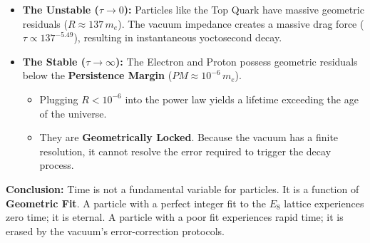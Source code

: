 \begin{itemize}
    \item \textbf{The Unstable ($\tau \to 0$):} Particles like the Top Quark have massive geometric residuals ($R \approx 137 \, m_e$). The vacuum impedance creates a massive drag force ($\tau \propto 137^{-5.49}$), resulting in instantaneous yoctosecond decay.
    \item \textbf{The Stable ($\tau \to \infty$):} The Electron and Proton possess geometric residuals below the \textbf{Persistence Margin} ($PM \approx 10^{-6} \, m_e$).
    \begin{itemize}
        \item Plugging $R < 10^{-6}$ into the power law yields a lifetime exceeding the age of the universe.
        \item They are \textbf{Geometrically Locked}. Because the vacuum has a finite resolution, it cannot resolve the error required to trigger the decay process.
    \end{itemize}
\end{itemize}

\textbf{Conclusion:} Time is not a fundamental variable for particles. It is a function of \textbf{Geometric Fit}. A particle with a perfect integer fit to the $E_8$ lattice experiences zero time; it is eternal. A particle with a poor fit experiences rapid time; it is erased by the vacuum's error-correction protocols.